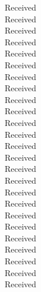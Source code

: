 \documentclass[12pt,letterpaper,twocolumn]{article}
\begin{document}
    \monthname[\the\month]\hfill\the\year\hfill Received\\
    \monthname[\the\month]\hfill\the\year\hfill Received\\
    \monthname[\the\month]\hfill\the\year\hfill Received\\
    \monthname[\the\month]\hfill\the\year\hfill Received\\
    \monthname[\the\month]\hfill\the\year\hfill Received\\
    \monthname[\the\month]\hfill\the\year\hfill Received\\
    \monthname[\the\month]\hfill\the\year\hfill Received\\
    \monthname[\the\month]\hfill\the\year\hfill Received\\
    \monthname[\the\month]\hfill\the\year\hfill Received\\
    \monthname[\the\month]\hfill\the\year\hfill Received\\
    \monthname[\the\month]\hfill\the\year\hfill Received\\
    \monthname[\the\month]\hfill\the\year\hfill Received\\
    \monthname[\the\month]\hfill\the\year\hfill Received\\
    \monthname[\the\month]\hfill\the\year\hfill Received\\
    \monthname[\the\month]\hfill\the\year\hfill Received\\
    \monthname[\the\month]\hfill\the\year\hfill Received\\
    \monthname[\the\month]\hfill\the\year\hfill Received\\
    \monthname[\the\month]\hfill\the\year\hfill Received\\
    \monthname[\the\month]\hfill\the\year\hfill Received\\
    \monthname[\the\month]\hfill\the\year\hfill Received\\
    \monthname[\the\month]\hfill\the\year\hfill Received\\
    \monthname[\the\month]\hfill\the\year\hfill Received\\
    \monthname[\the\month]\hfill\the\year\hfill Received\\
    \monthname[\the\month]\hfill\the\year\hfill Received\\
    \monthname[\the\month]\hfill\the\year\hfill Received
\end{document}
